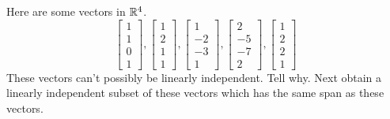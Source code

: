 \documentclass{ximera}
\begin{document}
\begin{problem}\label{prb:3.27} Here are some vectors in $\mathbb{R}^{4}$.
\begin{equation*}
\left[
\begin{array}{r}
1 \\
1 \\
0 \\
1
\end{array}
\right] ,\left[
\begin{array}{r}
1 \\
2 \\
1 \\
1
\end{array}
\right] ,\left[
\begin{array}{r}
1 \\
-2 \\
-3 \\
1
\end{array}
\right] ,\left[
\begin{array}{r}
2 \\
-5 \\
-7 \\
2
\end{array}
\right] ,\left[
\begin{array}{r}
1 \\
2 \\
2 \\
1
\end{array}
\right]
\end{equation*}
These vectors can't possibly be linearly independent. Tell why. Next obtain a
linearly independent subset of these vectors which has the same span as
these vectors. 
\end{problem}
\end{document}
